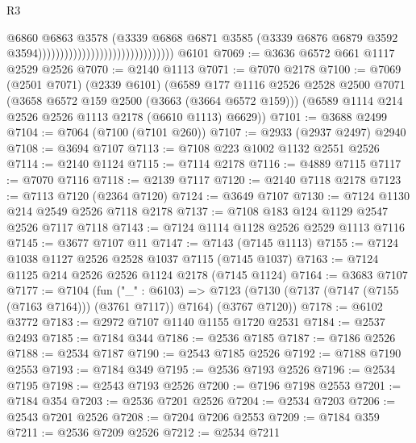 \begin{lexlean}{R3}
\begin{coremodule}
                                                              @6860
                                                              @6863
                                                              @3578
                                                              (@3339
                                                                @6868
                                                                @6871
                                                                @3585
                                                                (@3339
                                                                  @6876
                                                                  @6879
                                                                  @3592
                                                                  @3594)))))))))))))))))))))))))))))))
    @6101
@7069 := @3636 @6572 @661 @1117 @2529 @2526
@7070 := @2140 @1113
@7071 := @7070 @2178
@7100 := @7069
    (@2501 @7071)
    (@2339 @6101)
    (@6589
      @177
      @1116
      @2526
      @2528
      @2500
      @7071
      (@3658 @6572 @159 @2500 (@3663 (@3664 @6572 @159)))
      (@6589 @1114 @214 @2526 @2526 @1113 @2178 (@6610 @1113) @6629))
@7101 := @3688 @2499
@7104 := @7064 (@7100 (@7101 @260))
@7107 := @2933 (@2937 @2497) @2940
@7108 := @3694 @7107
@7113 := @7108 @223 @1002 @1132 @2551 @2526
@7114 := @2140 @1124
@7115 := @7114 @2178
@7116 := @4889 @7115
@7117 := @7070 @7116
@7118 := @2139 @7117
@7120 := @2140 @7118 @2178
@7123 := @7113 @7120 (@2364 @7120)
@7124 := @3649 @7107
@7130 := @7124 @1130 @214 @2549 @2526 @7118 @2178
@7137 := @7108 @183 @124 @1129 @2547 @2526 @7117 @7118
@7143 := @7124 @1114 @1128 @2526 @2529 @1113 @7116
@7145 := @3677 @7107 @11
@7147 := @7143 (@7145 @1113)
@7155 := @7124 @1038 @1127 @2526 @2528 @1037 @7115 (@7145 @1037)
@7163 := @7124 @1125 @214 @2526 @2526 @1124 @2178 (@7145 @1124)
@7164 := @3683 @7107
@7177 := @7104
    (fun ("_" : @6103) =>
    @7123 (@7130 (@7137 (@7147 (@7155 (@7163 @7164))) (@3761 @7117)) @7164) (@3767 @7120))
@7178 := @6102 @3772
@7183 := @2972 @7107 @1140 @1155 @1720 @2531
@7184 := @2537 @2493
@7185 := @7184 @344
@7186 := @2536 @7185
@7187 := @7186 @2526
@7188 := @2534 @7187
@7190 := @2543 @7185 @2526
@7192 := @7188 @7190 @2553
@7193 := @7184 @349
@7195 := @2536 @7193 @2526
@7196 := @2534 @7195
@7198 := @2543 @7193 @2526
@7200 := @7196 @7198 @2553
@7201 := @7184 @354
@7203 := @2536 @7201 @2526
@7204 := @2534 @7203
@7206 := @2543 @7201 @2526
@7208 := @7204 @7206 @2553
@7209 := @7184 @359
@7211 := @2536 @7209 @2526
@7212 := @2534 @7211

\end{coremodule}
\end{lexlean}
